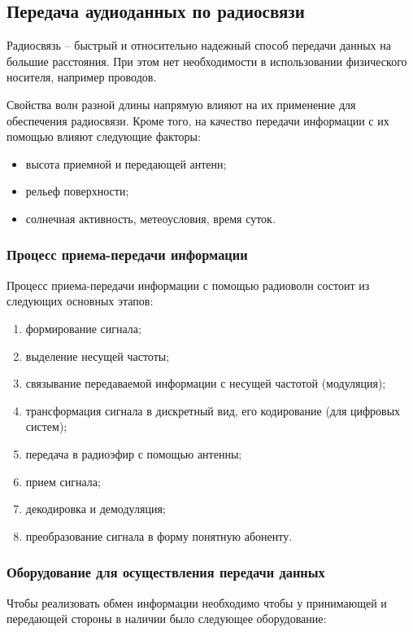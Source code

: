 \documentclass[a4paper]{report}
\begin{document}
\subsection{Передача аудиоданных по радиосвязи}

Радиосвязь – быстрый и относительно надежный способ передачи данных на большие расстояния. При этом нет необходимости в использовании физического носителя, например проводов.

Свойства волн разной длины напрямую влияют на их применение для обеспечения радиосвязи. Кроме того, на качество передачи информации с их помощью влияют следующие факторы:

\begin{itemize}
\item высота приемной и передающей антенн;
\item рельеф поверхности;
\item солнечная активность, метеоусловия, время суток.
\end{itemize}

\subsubsection{Процесс приема-передачи информации}

Процесс приема-передачи информации с помощью радиоволн состоит из следующих основных этапов:

\begin{enumerate}

\item формирование сигнала;
\item выделение несущей частоты;
\item связывание передаваемой информации с несущей частотой (модуляция);
\item трансформация сигнала в дискретный вид, его кодирование (для цифровых систем);
\item передача в радиоэфир с помощью антенны;
\item прием сигнала;
\item декодировка и демодуляция;
\item преобразование сигнала в форму понятную абоненту.
\end{enumerate}

\subsubsection{Оборудование для осуществления передачи данных}
Чтобы реализовать обмен информации необходимо чтобы у принимающей и передающей стороны в наличии было следующее оборудование:
\end{document}
